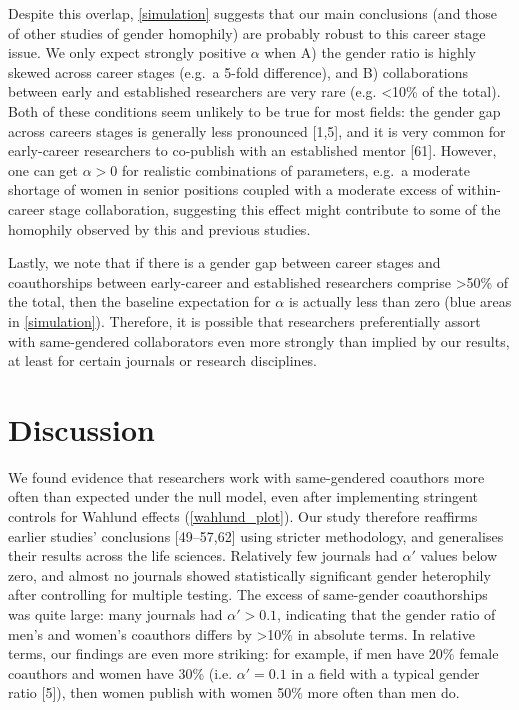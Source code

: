 \documentclass[12pt,]{article}
\begin{document}
Despite this overlap, \autoref{simulation} suggests that our main
conclusions (and those of other studies of gender homophily) are
probably robust to this career stage issue. We only expect strongly
positive \(\alpha\) when A) the gender ratio is highly skewed across
career stages (e.g.~a 5-fold difference), and B) collaborations between
early and established researchers are very rare (e.g. \textless{}10\% of
the total). Both of these conditions seem unlikely to be true for most
fields: the gender gap across careers stages is generally less
pronounced {[}1,5{]}, and it is very common for early-career researchers
to co-publish with an established mentor {[}61{]}. However, one can get
\(\alpha > 0\) for realistic combinations of parameters, e.g.~a moderate
shortage of women in senior positions coupled with a moderate excess of
within-career stage collaboration, suggesting this effect might
contribute to some of the homophily observed by this and previous
studies.

Lastly, we note that if there is a gender gap between career stages and
coauthorships between early-career and established researchers comprise
\textgreater{}50\% of the total, then the baseline expectation for
\(\alpha\) is actually less than zero (blue areas in
\autoref{simulation}). Therefore, it is possible that researchers
preferentially assort with same-gendered collaborators even more
strongly than implied by our results, at least for certain journals or
research disciplines.

\hypertarget{discussion}{%
\section{Discussion}\label{discussion}}

We found evidence that researchers work with same-gendered coauthors
more often than expected under the null model, even after implementing
stringent controls for Wahlund effects (\autoref{wahlund_plot}). Our
study therefore reaffirms earlier studies' conclusions {[}49--57,62{]}
using stricter methodology, and generalises their results across the
life sciences. Relatively few journals had \(\alpha'\) values below
zero, and almost no journals showed statistically significant gender
heterophily after controlling for multiple testing. The excess of
same-gender coauthorships was quite large: many journals had
\(\alpha' > 0.1\), indicating that the gender ratio of men's and women's
coauthors differs by \textgreater{}10\% in absolute terms. In relative
terms, our findings are even more striking: for example, if men have
20\% female coauthors and women have 30\% (i.e. \(\alpha' = 0.1\) in a
field with a typical gender ratio {[}5{]}), then women publish with
women 50\% more often than men do.
\end{document}
